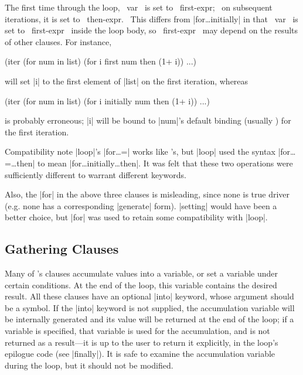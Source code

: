 \begin{clauses}
The first time through the loop, ~var~ is set to ~first-expr;~ on
subsequent iterations, it is set to ~then-expr.~  This differs from
|for\dots initially| in that ~var~ is set to ~first-expr~
inside the loop body, 
so ~first-expr~ may depend on the results of other clauses.  For
instance, 
\begin{program}
(iter (for num in list)
      (for i first num then (1+ i))
      ...)
\end{program}
will set |i| to the first element of |list| on the first
iteration, whereas 
\begin{program}
(iter (for num in list)
      (for i initially num then (1+ i))
      ...)
\end{program}
is probably erroneous; |i| will be bound to |num|'s
default binding (usually \nil) for the first iteration.

\end{clauses}

\begin{note}{Compatibility note}
|loop|'s |for\dots =| works like \iter's, but |loop| used the syntax
|for\dots =\dots then| to mean |for\dots initially\dots then|.  It was
felt that these two operations were sufficiently different to warrant
different keywords.

Also, the |for| in the above three clauses is misleading,
since none is true driver (e.g. none has a corresponding |generate|
form).  |setting| would have been a better choice, but |for| was used
to retain some compatibility with |loop|.  
\end{note}


\subsection{Gathering Clauses}
Many of \iter's clauses accumulate values into a variable, or set a
variable under certain conditions.  At the end of the loop, this
variable contains the desired result.  All these clauses have an
optional |into| keyword, whose argument should be a symbol.  If the
|into| keyword is not supplied, the accumulation variable will be
internally generated and its value will be returned at the end of the
loop; if a variable is specified, that variable is used for the
accumulation, and is not returned as a result---it is up to the user
to return it explicitly, in the loop's epilogue code (see |finally|).
It is safe to examine the accumulation variable during the loop, but
it should not be modified.

